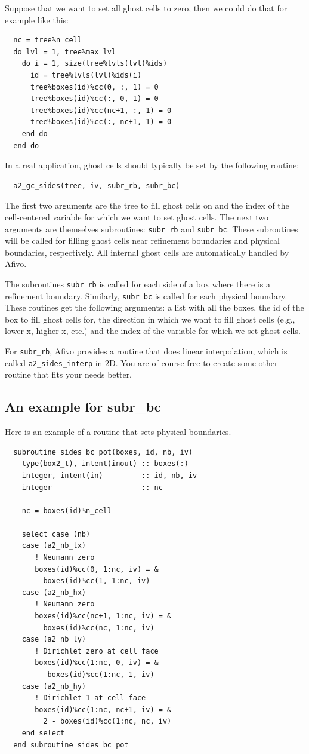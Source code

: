 \documentclass[a4paper, a4wide]{article}
\begin{document}
Suppose that we want to set all ghost cells to zero, then we could do that for
example like this:
\begin{lstlisting}
  nc = tree%n_cell
  do lvl = 1, tree%max_lvl
    do i = 1, size(tree%lvls(lvl)%ids)
      id = tree%lvls(lvl)%ids(i)
      tree%boxes(id)%cc(0, :, 1) = 0
      tree%boxes(id)%cc(:, 0, 1) = 0
      tree%boxes(id)%cc(nc+1, :, 1) = 0
      tree%boxes(id)%cc(:, nc+1, 1) = 0
    end do
  end do
\end{lstlisting}
In a real application, ghost cells should typically be set by the following routine:
\begin{lstlisting}
  a2_gc_sides(tree, iv, subr_rb, subr_bc)
\end{lstlisting}
The first two arguments are the tree to fill ghost cells on and the index of the
cell-centered variable for which we want to set ghost cells.
The next two arguments are themselves subroutines: \texttt{subr\_rb} and
\texttt{subr\_bc}.
These subroutines will be called for filling ghost cells near refinement
boundaries and physical boundaries, respectively.
All internal ghost cells are automatically handled by Afivo.

The subroutines \texttt{subr\_rb} is called for each side of a box where there
is a refinement boundary.
Similarly, \texttt{subr\_bc} is called for each physical boundary.
These routines get the following arguments: a list with all the boxes, the id of
the box to fill ghost cells for, the direction in which we want to fill ghost
cells (e.g., lower-x, higher-x, etc.)
and the index of the variable for which we set ghost cells.

For \texttt{subr\_rb}, Afivo provides a routine that does linear interpolation,
which is called \texttt{a2\_sides\_interp} in 2D.
You are of course free to create some other routine that fits your needs better.

\subsection{An example for subr\_bc}
\label{sec:ghost-cells-example}

Here is an example of a routine that sets physical boundaries.
\begin{lstlisting}
  subroutine sides_bc_pot(boxes, id, nb, iv)
    type(box2_t), intent(inout) :: boxes(:)
    integer, intent(in)         :: id, nb, iv
    integer                     :: nc

    nc = boxes(id)%n_cell

    select case (nb)
    case (a2_nb_lx)
       ! Neumann zero
       boxes(id)%cc(0, 1:nc, iv) = &
         boxes(id)%cc(1, 1:nc, iv)
    case (a2_nb_hx)
       ! Neumann zero
       boxes(id)%cc(nc+1, 1:nc, iv) = &
         boxes(id)%cc(nc, 1:nc, iv)
    case (a2_nb_ly)
       ! Dirichlet zero at cell face
       boxes(id)%cc(1:nc, 0, iv) = &
         -boxes(id)%cc(1:nc, 1, iv)
    case (a2_nb_hy)
       ! Dirichlet 1 at cell face
       boxes(id)%cc(1:nc, nc+1, iv) = &
         2 - boxes(id)%cc(1:nc, nc, iv)
    end select
  end subroutine sides_bc_pot
\end{lstlisting}
\end{document}
